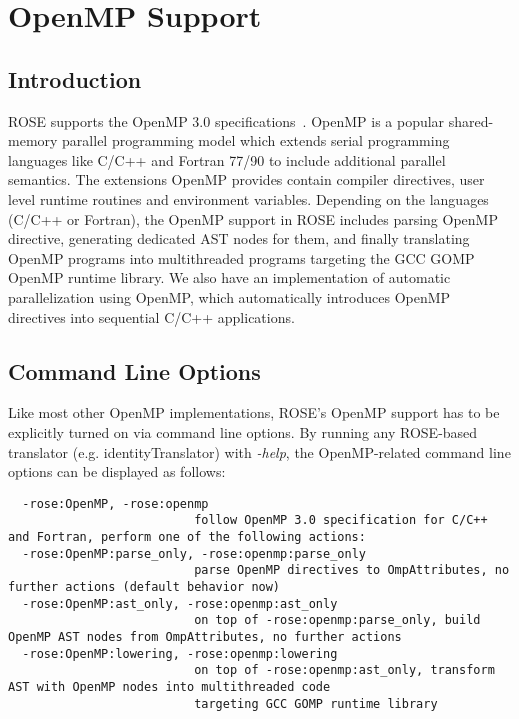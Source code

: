 \chapter{OpenMP Support}
\label{chap::ompsupport}

\section{Introduction}
ROSE supports the OpenMP 3.0 specifications~\cite{OpenMP3.0}. 
OpenMP is a popular shared-memory parallel programming model which extends serial programming languages like C/C++ and Fortran 77/90 to include additional parallel semantics. 
The extensions OpenMP provides contain compiler directives, user level runtime routines and environment variables. 
Depending on the languages (C/C++ or Fortran), the OpenMP support in ROSE
includes parsing OpenMP directive, generating dedicated AST nodes for them,
and finally translating OpenMP programs into multithreaded programs targeting the GCC GOMP OpenMP runtime library. 
We also have an implementation of automatic parallelization using OpenMP,
which automatically introduces OpenMP directives into sequential C/C++ applications.

\section{Command Line Options}
Like most other OpenMP implementations, ROSE's OpenMP support has to be explicitly turned on via command line options.
By running any ROSE-based translator (e.g. identityTranslator) with \textit{-help}, 
the OpenMP-related command line options can be displayed as follows: 
{\scriptsize
\begin{verbatim}
  -rose:OpenMP, -rose:openmp
                          follow OpenMP 3.0 specification for C/C++ and Fortran, perform one of the following actions:
  -rose:OpenMP:parse_only, -rose:openmp:parse_only
                          parse OpenMP directives to OmpAttributes, no further actions (default behavior now)
  -rose:OpenMP:ast_only, -rose:openmp:ast_only
                          on top of -rose:openmp:parse_only, build OpenMP AST nodes from OmpAttributes, no further actions
  -rose:OpenMP:lowering, -rose:openmp:lowering
                          on top of -rose:openmp:ast_only, transform AST with OpenMP nodes into multithreaded code 
                          targeting GCC GOMP runtime library
\end{verbatim}
}
